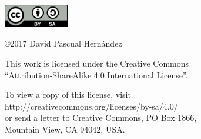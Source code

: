 \pagebreak
\thispagestyle{empty}
\vspace*{12cm}

\begin{flushright}

\includegraphics[height=1.0cm]{figures/CC-BY-SA.png}

\vspace*{0.5cm}

\copyright 2017 David Pascual Hernández

\vspace*{0.3cm}

This work is licensed under the Creative Commons \\
``Attribution-ShareAlike 4.0 International License''.

\vspace{0.2cm}

To view a copy of this license, visit \\
http://creativecommons.org/licenses/by-sa/4.0/ \\
or send a letter to Creative Commons, PO Box 1866, \\ Mountain View, CA 94042, USA.

\end{flushright}